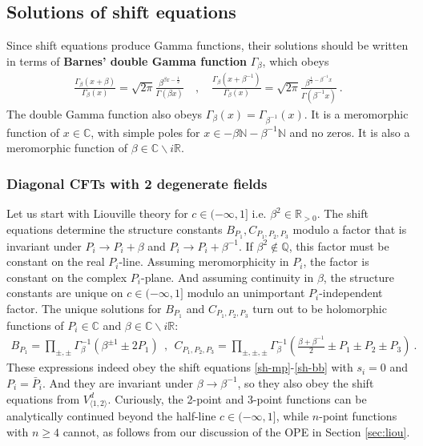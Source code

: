 \documentclass[12pt, a4paper]{article}
\theoremstyle{break}
\begin{document}
\subsection{Solutions of shift equations}\label{sec:essc}

Since shift equations produce Gamma functions, their solutions should be written in terms of \textbf{Barnes' double Gamma function} $\Gamma_\beta$, which obeys
\begin{align}
\frac{\Gamma_\beta(x+\beta)}{\Gamma_\beta(x)} = \sqrt{2\pi}\frac{\beta^{\beta x-\frac12}}{\Gamma(\beta x)}
\quad , \quad 
\frac{\Gamma_\beta(x+\beta^{-1})}{\Gamma_\beta(x)} = \sqrt{2\pi}\frac{\beta^{\frac12-\beta^{-1}x}}{\Gamma(\beta^{-1}x)} \ .
\label{gshift}
\end{align}
The double Gamma function also obeys $\Gamma_\beta(x)= \Gamma_{\beta^{-1}}(x)$. It is a meromorphic function of $x\in\mathbb{C}$, with simple poles for $x\in -\beta\mathbb{N}-\beta^{-1}\mathbb{N}$ and no zeros. It is also a meromorphic function of $\beta\in \mathbb{C}\backslash i\mathbb{R}$. 

\subsubsection{Diagonal CFTs with 2 degenerate fields}

Let us start with Liouville theory for $c\in (-\infty ,1]$ i.e. $\beta^2\in\mathbb{R}_{>0}$. The shift equations determine the structure constants $B_{P_1},C_{P_1,P_2,P_3}$ modulo a factor that is invariant under $P_i\to P_i+\beta$ and $P_i\to P_i+\beta^{-1}$. 
If $\beta^2\notin \mathbb{Q}$, this factor must be constant on the real $P_i$-line. Assuming meromorphicity in $P_i$, the factor is constant on the complex $P_i$-plane. And assuming continuity in $\beta$, the structure constants are unique on $c\in (-\infty,1]$ modulo an unimportant $P_i$-independent factor. The unique solutions for $B_{P_1}$ and $C_{P_1,P_2,P_3}$ turn out to be holomorphic functions of $P_i\in\mathbb{C}$ and $\beta\in \mathbb{C}\backslash i\mathbb{R}$:
\begin{align}
 \boxed{B_{P_1} = \prod_{\pm,\pm}\Gamma_\beta^{-1}\left(\beta^{\pm 1}\pm 2P_1\right)} \ \  , \ \ \boxed{C_{P_1,P_2,P_3} =\prod_{\pm,\pm,\pm} \Gamma_\beta^{-1}\left(\tfrac{\beta+\beta^{-1}}{2} \pm P_1\pm P_2\pm P_3\right)}\ . 
 \label{bc}
\end{align}
These expressions indeed obey the shift equations \eqref{sh-mp}-\eqref{sh-bb} with $s_i=0$ and $P_i=\bar P_i$. And they are invariant under $\beta \to \beta^{-1}$, so they also obey the shift equations from $V^d_{\langle 1,2\rangle}$. 
Curiously, the 2-point and 3-point functions can be analytically continued beyond the half-line $c\in (-\infty ,1]$, while $n$-point functions with $n\geq 4$ cannot, as follows from our discussion of the OPE in Section \ref{sec:liou}. 
\end{document}
